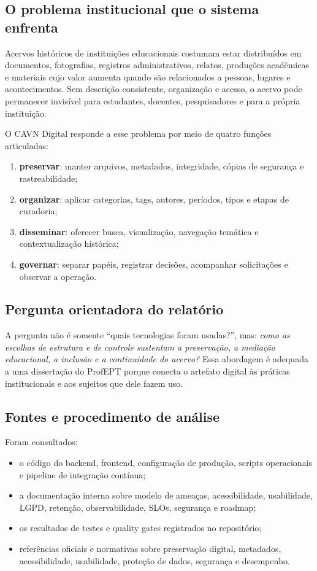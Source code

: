 \documentclass[11pt,a4paper]{article}
\begin{document}
\subsection{O problema institucional que o sistema enfrenta}

Acervos históricos de instituições educacionais costumam estar distribuídos em documentos, fotografias, registros administrativos, relatos, produções acadêmicas e materiais cujo valor aumenta quando são relacionados a pessoas, lugares e acontecimentos. Sem descrição consistente, organização e acesso, o acervo pode permanecer invisível para estudantes, docentes, pesquisadores e para a própria instituição.

O CAVN Digital responde a esse problema por meio de quatro funções articuladas:

\begin{enumerate}
  \item \textbf{preservar}: manter arquivos, metadados, integridade, cópias de segurança e rastreabilidade;
  \item \textbf{organizar}: aplicar categorias, tags, autores, períodos, tipos e etapas de curadoria;
  \item \textbf{disseminar}: oferecer busca, visualização, navegação temática e contextualização histórica;
  \item \textbf{governar}: separar papéis, registrar decisões, acompanhar solicitações e observar a operação.
\end{enumerate}

\subsection{Pergunta orientadora do relatório}

A pergunta não é somente ``quais tecnologias foram usadas?'', mas: \textit{como as escolhas de estrutura e de controle sustentam a preservação, a mediação educacional, a inclusão e a continuidade do acervo?} Essa abordagem é adequada a uma dissertação do ProfEPT porque conecta o artefato digital às práticas institucionais e aos sujeitos que dele fazem uso.

\subsection{Fontes e procedimento de análise}

Foram consultados:

\begin{itemize}
  \item o código do backend, frontend, configuração de produção, scripts operacionais e pipeline de integração contínua;
  \item a documentação interna sobre modelo de ameaças, acessibilidade, usabilidade, LGPD, retenção, observabilidade, SLOs, segurança e roadmap;
  \item os resultados de testes e quality gates registrados no repositório;
  \item referências oficiais e normativas sobre preservação digital, metadados, acessibilidade, usabilidade, proteção de dados, segurança e desempenho.
\end{itemize}
\end{document}
